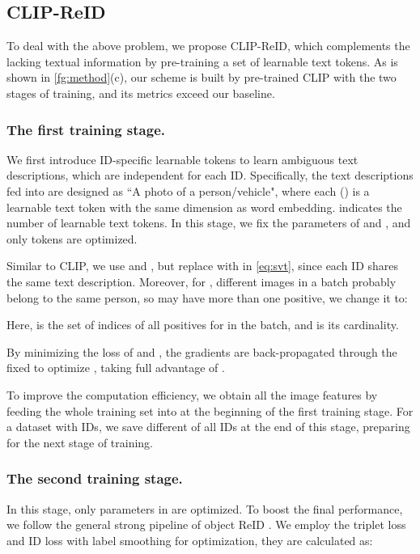\documentclass[letterpaper]{article} \usepackage{aaai23}  \usepackage{times}  \usepackage{helvet}  \usepackage{courier}  \usepackage[hyphens]{url}  \usepackage{graphicx} \urlstyle{rm} \def\UrlFont{\rm}  \usepackage{natbib}  \usepackage{caption} \frenchspacing  \setlength{\pdfpagewidth}{8.5in}  \setlength{\pdfpageheight}{11in}  \usepackage{algorithm}
\begin{document}
\subsection{CLIP-ReID}
To deal with the above problem, we propose CLIP-ReID, which complements the lacking textual information by pre-training a set of learnable text tokens. As is shown in \cref{fg:method}(c), our scheme is built by pre-trained CLIP with the two stages of training, and its metrics exceed our baseline.


\subsubsection{The first training stage.} We first introduce ID-specific learnable tokens to learn ambiguous text descriptions, which are independent for each ID. Specifically, the text descriptions fed into  are designed as ``A photo of a  person/vehicle", where each () is a learnable text token with the same dimension as word embedding.  indicates the number of learnable text tokens. In this stage, we fix the parameters of  and , and only tokens   are optimized. 

Similar to CLIP, we use  and , but replace  with  in \cref{eq:svt}, since each ID shares the same text description. Moreover, for , different images in a batch probably belong to the same person, so  may have more than one positive, we change it to: 


Here,  is the set of indices of all positives for  in the batch, and  is its cardinality.

By minimizing the loss of  and , the gradients are back-propagated through the fixed  to optimize , taking full advantage of .


To improve the computation efficiency, we obtain all the image features by feeding the whole training set into  at the beginning of the first training stage. For a dataset with  IDs, we save  different  of all IDs at the end of this stage, preparing for the next stage of training.


\subsubsection{The second training stage.}In this stage, only parameters in  are optimized. To boost the final performance, we follow the general strong pipeline of object ReID \cite{strongbaseline}. We employ the triplet loss  and ID loss  with label smoothing for optimization, they are calculated as: 
\end{document}
